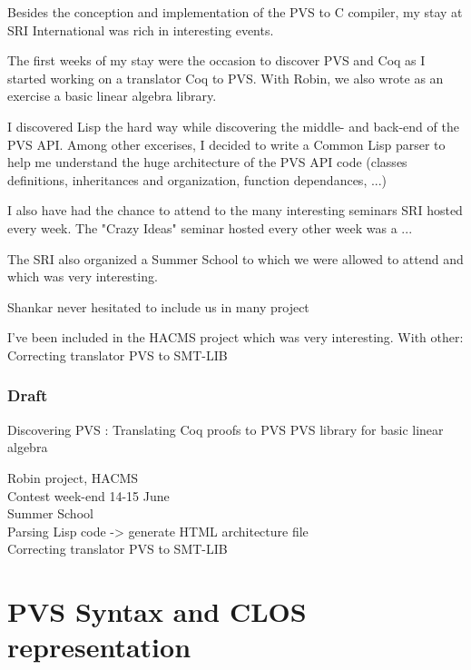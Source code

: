 \documentclass[12pt,a4paper]{article}
\begin{document}
Besides the conception and implementation of the PVS to C compiler, my stay at SRI International was rich in interesting events.

The first weeks of my stay were the occasion to discover PVS and Coq as I started working on a translator Coq to PVS. With Robin, we also wrote as an exercise a basic linear algebra library.

I discovered Lisp the hard way while discovering the middle- and back-end of the PVS API. Among other excerises, I decided to write a Common Lisp parser to help me understand the huge architecture of the PVS API code (classes definitions, inheritances and organization, function dependances, ...)

I also have had the chance to attend to the many interesting seminars SRI hosted every week. The "Crazy Ideas" seminar hosted every other week was a ...

The SRI also organized a Summer School to which we were allowed to attend and which was very interesting.

Shankar never hesitated to include us in many project

I've been included in the HACMS project which was very interesting.
With other:
Correcting translator PVS to SMT-LIB




\subsubsection*{Draft}
Discovering PVS :
Translating Coq proofs to PVS
PVS library for basic linear algebra

Robin project, HACMS \\
Contest week-end 14-15 June \\
Summer School \\
Parsing Lisp code -> generate HTML architecture file\\
Correcting translator PVS to SMT-LIB
\cite{pavol}












\appendix

\newpage
\section{PVS Syntax and CLOS representation}
\end{document}
